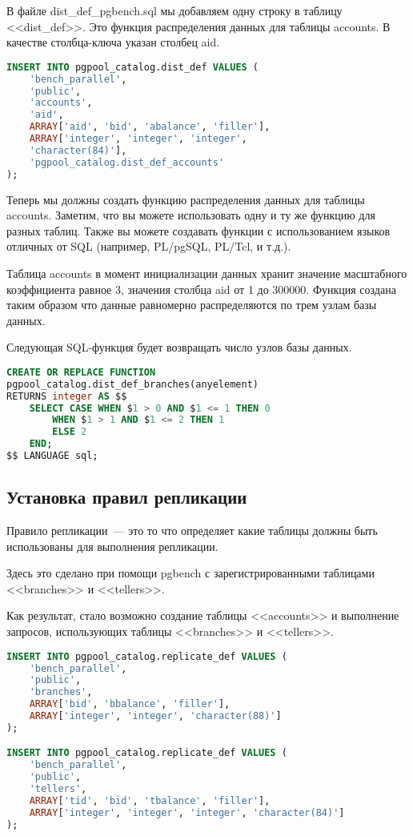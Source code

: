 В файле dist\_def\_pgbench.sql мы добавляем одну строку в таблицу <<dist\_def>>. Это функция распределения данных для таблицы accounts. В качестве столбца-ключа указан столбец aid.

\begin{lstlisting}[language=SQL,label=lst:pgpool33,caption=Установка правил распределения данных]
INSERT INTO pgpool_catalog.dist_def VALUES (
    'bench_parallel',
    'public',
    'accounts',
    'aid',
    ARRAY['aid', 'bid', 'abalance', 'filler'],
    ARRAY['integer', 'integer', 'integer',
    'character(84)'],
    'pgpool_catalog.dist_def_accounts'
);
\end{lstlisting}

Теперь мы должны создать функцию распределения данных для таблицы accounts. Заметим, что вы можете использовать одну и ту же функцию для разных таблиц. Также вы можете создавать функции с использованием языков отличных от SQL (например, PL/pgSQL, PL/Tcl, и т.д.).

Таблица accounts в момент инициализации данных хранит значение масштабного коэффициента равное 3, значения столбца aid от 1 до 300000. Функция создана таким образом что данные равномерно распределяются по трем узлам базы данных.

Следующая SQL-функция будет возвращать число узлов базы данных.

\begin{lstlisting}[language=SQL,label=lst:pgpool34,caption=Установка правил распределения данных]
CREATE OR REPLACE FUNCTION
pgpool_catalog.dist_def_branches(anyelement)
RETURNS integer AS $$
    SELECT CASE WHEN $1 > 0 AND $1 <= 1 THEN 0
        WHEN $1 > 1 AND $1 <= 2 THEN 1
        ELSE 2
    END;
$$ LANGUAGE sql;
\end{lstlisting}

\subsection{Установка правил репликации}

Правило репликации~--- это то что определяет какие таблицы должны быть использованы для выполнения репликации.

Здесь это сделано при помощи pgbench с зарегистрированными таблицами <<branches>> и <<tellers>>.

Как результат, стало возможно создание таблицы <<accounts>> и выполнение запросов, использующих таблицы <<branches>> и <<tellers>>.

\begin{lstlisting}[language=SQL,label=lst:pgpool35,caption=Установка правил репликации]
INSERT INTO pgpool_catalog.replicate_def VALUES (
    'bench_parallel',
    'public',
    'branches',
    ARRAY['bid', 'bbalance', 'filler'],
    ARRAY['integer', 'integer', 'character(88)']
);

INSERT INTO pgpool_catalog.replicate_def VALUES (
    'bench_parallel',
    'public',
    'tellers',
    ARRAY['tid', 'bid', 'tbalance', 'filler'],
    ARRAY['integer', 'integer', 'integer', 'character(84)']
);
\end{lstlisting}

